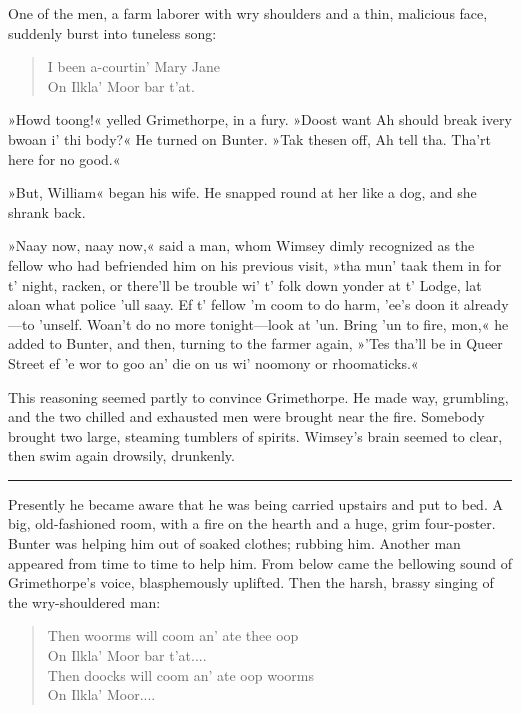 One of the men, a farm laborer with wry shoulders and a thin, malicious face, suddenly burst into tuneless song: 
\begin{samepage}
\begin{verse}
\begin{altverse}
I been a-courtin' Mary Jane\\
On Ilkla' Moor bar t'at.
\end{altverse}
\end{verse}
\end{samepage}

 »Howd toong!« yelled Grimethorpe, in a fury. »Doost want Ah should break ivery bwoan i' thi body?« He turned on Bunter. »Tak thesen off, Ah tell tha. Tha'rt here for no good.«

»But, William\longdash« began his wife. He snapped round at her like a dog, and she shrank back.

»Naay now, naay now,« said a man, whom Wimsey dimly recognized as the fellow who had befriended him on his previous visit, »tha mun' taak them in for t' night, racken, or there'll be trouble wi' t' folk down yonder at t' Lodge, lat aloan what police 'ull saay. Ef t' fellow 'm coom to do harm, 'ee's doon it already\allowbreak---\allowbreak to 'unself. Woan't do no more tonight\allowbreak---\allowbreak look at 'un. Bring 'un to fire, mon,« he added to Bunter, and then, turning to the farmer again, »'Tes tha'll be in Queer Street ef 'e wor to goo an' die on us wi' noomony or rhoomaticks.«

This reasoning seemed partly to convince Grimethorpe. He made way, grumbling, and the two chilled and exhausted men were brought near the fire. Somebody brought two large, steaming tumblers of spirits.  Wimsey's brain seemed to clear, then swim again drowsily, drunkenly. 

\noindent\hfil\rule{0.5\textwidth}{.4pt}\hfil 

Presently he became aware that he was being carried upstairs and put to bed. A big, old-fashioned room, with a fire on the hearth and a huge, grim four-poster. Bunter was helping him out of soaked clothes; rubbing him. Another man appeared from time to time to help him. From below came the bellowing sound of Grimethorpe's voice, blasphemously uplifted. Then the harsh, brassy singing of the wry-shouldered man: 

\begin{verse}
\begin{altverse}
Then woorms will coom an' ate thee oop\\
On Ilkla' Moor bar t'at....\\
Then doocks will coom an' ate oop woorms\\
On Ilkla' Moor....\\
\end{altverse}
\end{verse}



